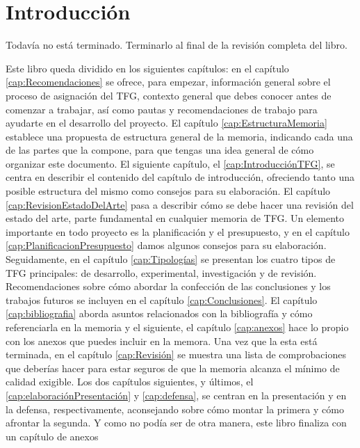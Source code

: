 \chapter{Introducción}
\label{cap:Introducción}

Todavía no está terminado. Terminarlo al final de la revisión completa del libro.


Este libro queda dividido en los siguientes capítulos: en el capítulo \ref{cap:Recomendaciones} se ofrece, para empezar, información general sobre el proceso de asignación del TFG, contexto general que debes conocer antes de comenzar a trabajar, así como pautas y recomendaciones de trabajo para ayudarte en el desarrollo del proyecto. El capítulo \ref{cap:EstructuraMemoria} establece una propuesta de estructura general de la memoria, indicando cada una de las partes que la compone, para que tengas una idea general de cómo organizar este documento. El siguiente capítulo, el \ref{cap:IntroducciónTFG}, se centra en describir el contenido del capítulo de introducción, ofreciendo tanto una posible estructura del mismo como consejos para su elaboración. El capítulo \ref{cap:RevisionEstadoDelArte} pasa a describir cómo se debe hacer una revisión del estado del arte, parte fundamental en cualquier memoria de TFG. Un elemento importante en todo proyecto es la planificación y el presupuesto, y en el capítulo \ref{cap:PlanificacionPresupuesto} damos algunos consejos para su elaboración. Seguidamente, en el capítulo \ref{cap:Tipologías} se presentan los cuatro tipos de TFG principales: de desarrollo, experimental, investigación y de revisión. Recomendaciones sobre cómo abordar la confección de las conclusiones y los trabajos futuros se incluyen en el capítulo \ref{cap:Conclusiones}. El capítulo \ref{cap:bibliografia} aborda asuntos relacionados con la bibliografía y cómo referenciarla en la memoria y el siguiente, el capítulo \ref{cap:anexos} hace lo propio con los anexos que puedes incluir en la memora.  Una vez que la esta está terminada, en el capítulo \ref{cap:Revisión} se muestra una lista de comprobaciones que deberías hacer para estar seguros de que la memoria alcanza el mínimo de calidad exigible. Los dos capítulos siguientes, y últimos, el \ref{cap:elaboraciónPresentación} y \ref{cap:defensa}, se centran en la presentación y en la defensa, respectivamente, aconsejando sobre cómo montar la primera y cómo afrontar la segunda. Y como no podía ser de otra manera, este libro finaliza con un capítulo de anexos 